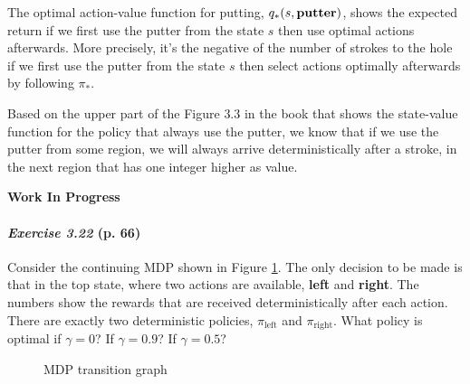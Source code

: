 \documentclass[10pt,a4paper]{article}
\begin{document}
\bigskip
The optimal action-value function for putting, $q_*(s, \textrm{\textbf{putter}})$, shows the expected return if we first use the putter from the state $s$ then use optimal actions afterwards. More precisely, it's the negative of the number of strokes to the hole if we first use the putter from the state $s$ then select actions optimally afterwards by following $\pi_*$.

Based on the upper part of the Figure $3.3$ in the book that shows the state-value function for the policy that always use the putter, we know that if we use the putter from some region, we will always arrive deterministically after a stroke, in the next region that has one integer higher as value.

\textbf{Work In Progress}

\clearpage
\paragraph{\textit{Exercise 3.22} (p. 66)} 

Consider the continuing MDP shown in Figure \ref{mdp_transition_graph}. The only decision to be made is that in the top state, where two actions are available, \textbf{left} and \textbf{right}. The numbers show the rewards that are received deterministically after each action. There are exactly two deterministic policies,
$\pi_\textrm{left}$ and $\pi_\textrm{right}$. What policy is optimal if $\gamma = 0$? If $\gamma = 0.9$?
If $\gamma = 0.5$?

\begin{figure}[h!]
\centering
{}
\caption{MDP transition graph}
\label{mdp_transition_graph}
\end{figure}
\end{document}

